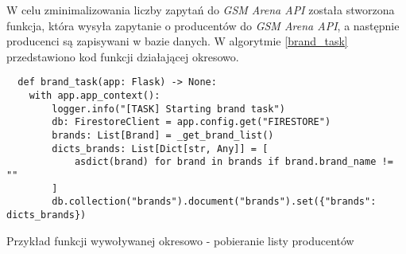 W celu zminimalizowania liczby zapytań do \textit{GSM Arena API} została stworzona funkcja, która wysyła zapytanie o producentów do \textit{GSM Arena API}, a następnie producenci są zapisywani w bazie danych. W algorytmie \ref{brand_task} przedstawiono kod funkcji działającej okresowo.

\begin{code}[H]
  \begin{verbatim}
  def brand_task(app: Flask) -> None:
    with app.app_context():
        logger.info("[TASK] Starting brand task")
        db: FirestoreClient = app.config.get("FIRESTORE")
        brands: List[Brand] = _get_brand_list()
        dicts_brands: List[Dict[str, Any]] = [
            asdict(brand) for brand in brands if brand.brand_name != ""
        ]
        db.collection("brands").document("brands").set({"brands": dicts_brands})
  \end{verbatim}
  \caption{Przykład funkcji wywoływanej okresowo - pobieranie listy producentów}
  \label{brand_task}
\end{code}


